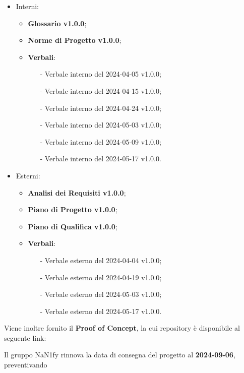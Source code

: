 \documentclass[8pt]{article}
\begin{document}
\begin{itemize}
    \item Interni:
\begin{itemize}
    \item \textbf{Glossario v1.0.0};
    \item \textbf{Norme di Progetto v1.0.0};
    \item \textbf{Verbali}:
    \begin{itemize}
			\item[-] Verbale interno del 2024-04-05 v1.0.0;
			\item[-] Verbale interno del 2024-04-15 v1.0.0;
			\item[-] Verbale interno del 2024-04-24 v1.0.0;	
			\item[-] Verbale interno del 2024-05-03 v1.0.0;
			\item[-] Verbale interno del 2024-05-09 v1.0.0;
			\item[-] Verbale interno del 2024-05-17 v1.0.0.
    \end{itemize}
\end{itemize}
    \item Esterni:
\begin{itemize}
    \item \textbf{Analisi dei Requisiti v1.0.0};
    \item \textbf{Piano di Progetto v1.0.0};
    \item \textbf{Piano di Qualifica v1.0.0};
    \item \textbf{Verbali}:
    \begin{itemize}
			\item[-] Verbale esterno del 2024-04-04 v1.0.0;
			\item[-] Verbale esterno del 2024-04-19 v1.0.0;
			\item[-] Verbale esterno del 2024-05-03 v1.0.0;
			\item[-] Verbale esterno del 2024-05-17 v1.0.0.
    \end{itemize}
\end{itemize}
\end{itemize}
\vspace{1em}
Viene inoltre fornito il \textbf{Proof of Concept}, la cui repository è disponibile al seguente link:
\begin{center}
	\textbf{\href{https://github.com/NaN1fy/SyncCity}{\color{myblue}{https://github.com/NaN1fy/SyncCity}}}
\end{center}
Il gruppo NaN1fy rinnova la data di consegna del progetto al \textbf{2024-09-06}, preventivando
\end{document}
